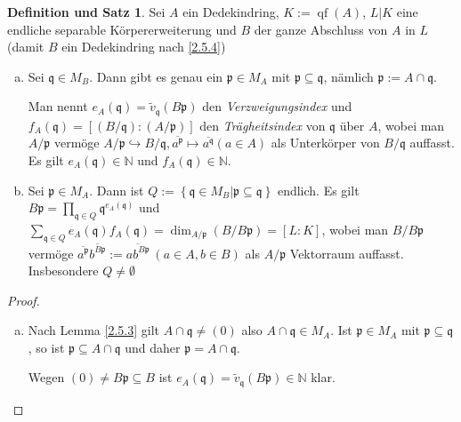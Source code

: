 \documentclass[
twoside=semi,
fontsize=12,
DIV=12, 
cleardoublepage=current,
leqno,
headings=optiontoheadandtoc, 
toc=idx
]{scrbook}
\newcommand{\N}{\mathbb{N}}
\newcommand{\set}[1]{\left\{ #1 \right\}}
\DeclareMathOperator{\qf}{qf}
\theoremstyle{definition}
\newtheorem{def-satz}[definition]{Definition und Satz}
\begin{document}
 	\begin{def-satz}\label{2.7.5}\hfill\newline
 		Sei $A$ ein Dedekindring, $K:= \qf(A)$, $L|K$ eine endliche separable K\"orpererweiterung und $B$ der ganze Abschluss von $A$ in $L$ (damit $B$ ein Dedekindring nach \ref{2.5.4})
 		
 		\begin{enumerate}[(a)]
 			\item 
 			Sei $\mathfrak{q} \in M_B$. Dann gibt es genau ein $\mathfrak{p} \in M_A$ mit $\mathfrak{p} \subseteq \mathfrak{q}$, n\"amlich $\mathfrak{p} := A \cap \mathfrak{q}$.
 			
 			Man nennt $e_A(\mathfrak{q}) = \tilde{v}_\mathfrak{q}(B\mathfrak{p})$ den \emph{Verzweigungsindex} und $f_A(\mathfrak{q}) = [(B/\mathfrak{q}):(A/\mathfrak{p})]$ den \emph{Tr\"agheitsindex} von $\mathfrak{q}$ \"uber $A$, wobei man $A/\mathfrak{p}$ verm\"oge $A/\mathfrak{p} \hookrightarrow B/ \mathfrak{q}, \overline{a^\mathfrak{p}} \mapsto \overline{a^\mathfrak{q}} (a \in A)$ als Unterk\"orper von $B/\mathfrak{q}$ auffasst. Es gilt $e_A(\mathfrak{q}) \in \N$ und $f_A(\mathfrak{q}) \in \N$.
 			
 			\item 
 			Sei $\mathfrak{p} \in M_A$. Dann ist $Q:= \set{\mathfrak{q} \in M_B| \mathfrak{p} \subseteq \mathfrak{q}}$ endlich. Es gilt $B\mathfrak{p} = \prod_{\mathfrak{q} \in Q} \mathfrak{q}^{e_A(\mathfrak{q})}$ und 
 			$\sum_{\mathfrak{q} \in Q} e_A(\mathfrak{q})f_A(\mathfrak{q}) = \dim_{A/\mathfrak{p}}(B/B\mathfrak{p}) = [L:K]$, wobei man $B/B\mathfrak{p}$ verm\"oge \linebreak $\overline{a^\mathfrak{p}}\overline{b^{B\mathfrak{p}}} := \overline{ab^{B\mathfrak{p}}} \ (a \in A, b \in B)$ als $A/\mathfrak{p}$ Vektorraum auffasst. Insbesondere $Q \neq \emptyset$
 		\end{enumerate}
 	
 		\begin{proof}\hfill
 			\begin{enumerate}[(a)]
 				\item 
 				Nach Lemma \ref{2.5.3} gilt $A \cap \mathfrak{q} \neq (0)$ also $A \cap \mathfrak{q} \in M_A$. Ist $\mathfrak{p} \in M_A$ mit $\mathfrak{p} \subseteq \mathfrak{q}$, so ist $\mathfrak{p} \subseteq A \cap \mathfrak{q}$ und daher $\mathfrak{p} = A \cap \mathfrak{q}$.
 				
 				Wegen $(0) \neq B\mathfrak{p} \subseteq B$ ist $e_A(\mathfrak{q}) = \tilde{v}_\mathfrak{q}(B\mathfrak{p}) \in \N$ klar.
 				

\end{enumerate}
\end{proof}
\end{def-satz}
\end{document}
